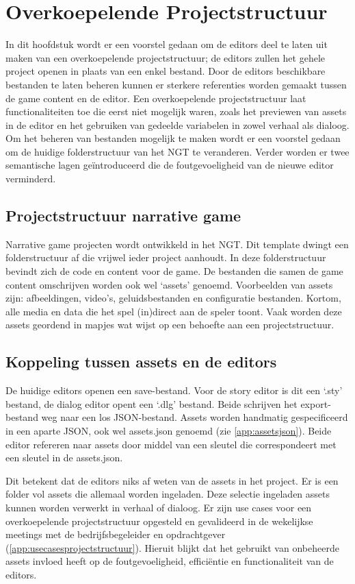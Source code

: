 \chapter{Overkoepelende Projectstructuur}
\label{ch:overkoepelendeprojectstructuur}
In dit hoofdstuk wordt er een voorstel gedaan om de editors deel te laten uit maken van een overkoepelende projectstructuur; de editors zullen het gehele project openen in plaats van een enkel bestand. Door de editors beschikbare bestanden te laten beheren kunnen er sterkere referenties worden gemaakt tussen de game content en de editor. Een overkoepelende projectstructuur laat functionaliteiten toe die eerst niet mogelijk waren, zoals het previewen van assets in de editor en het gebruiken van gedeelde variabelen in zowel verhaal als dialoog. Om het beheren van bestanden mogelijk te maken wordt er een voorstel gedaan om de huidige folderstructuur van het NGT te veranderen. Verder worden er twee semantische lagen geïntroduceerd die de foutgevoeligheid van de nieuwe editor verminderd.

\section{Projectstructuur narrative game}
Narrative game projecten wordt ontwikkeld in het NGT. Dit template dwingt een folderstructuur af die vrijwel ieder project aanhoudt. In deze folderstructuur bevindt zich de code en content voor de game. De bestanden die samen de game content omschrijven worden ook wel ‘assets’ genoemd. Voorbeelden van assets zijn: afbeeldingen, video’s, geluidsbestanden en configuratie bestanden. Kortom, alle media en data die het spel (in)direct aan de speler toont. Vaak worden deze assets geordend in mapjes wat wijst op een behoefte aan een projectstructuur.

\section{Koppeling tussen assets en de editors}
De huidige editors openen een save-bestand. Voor de story editor is dit een ‘.sty’ bestand, de dialog editor opent een ‘.dlg’ bestand. Beide schrijven het export-bestand weg naar een los JSON-bestand. Assets worden handmatig gespecificeerd in een aparte JSON, ook wel assets.json genoemd (zie \autoref{app:assetsjson}). Beide editor refereren naar assets door middel van een sleutel die correspondeert met een sleutel in de assets.json. 

Dit betekent dat de editors niks af weten van de assets in het project. Er is een folder vol assets die allemaal worden ingeladen. Deze selectie ingeladen assets kunnen worden verwerkt in verhaal of dialoog. Er zijn use cases voor een overkoepelende projectstructuur opgesteld en gevalideerd in de wekelijkse meetings met de bedrijfsbegeleider en opdrachtgever (\autoref{app:usecasesprojectstructuur}). Hieruit blijkt dat het gebruikt van onbeheerde assets invloed heeft op de foutgevoeligheid, efficiëntie en functionaliteit van de editors. 

